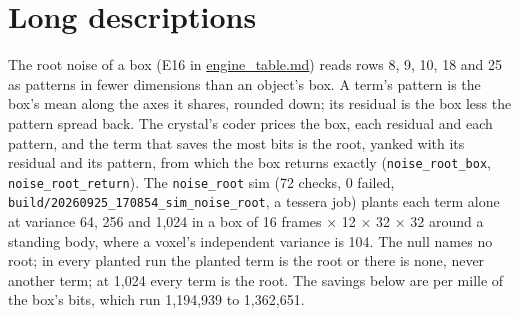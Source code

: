 \section{\texorpdfstring{Long descriptions}{Long descriptions}}

The root noise of a box (E16 in \hyperref[chap:engine-table]{engine\_\allowbreak{}table.md}) reads rows 8, 9, 10, 18 and 25 as patterns in fewer dimensions than an object's box. A term's pattern is the box's mean along the axes it shares, rounded down; its residual is the box less the pattern spread back. The crystal's coder prices the box, each residual and each pattern, and the term that saves the most bits is the root, yanked with its residual and its pattern, from which the box returns exactly (\texttt{noise\_\allowbreak{}root\_\allowbreak{}box}, \texttt{noise\_\allowbreak{}root\_\allowbreak{}return}). The \texttt{noise\_\allowbreak{}root} sim (72 checks, 0 failed, \texttt{build/\allowbreak{}20260925\_\allowbreak{}170854\_\allowbreak{}sim\_\allowbreak{}noise\_\allowbreak{}root}, a tessera job) plants each term alone at variance 64, 256 and 1,024 in a box of 16 frames × 12 × 32 × 32 around a standing body, where a voxel's independent variance is 104. The null names no root; in every planted run the planted term is the root or there is none, never another term; at 1,024 every term is the root. The savings below are per mille of the box's bits, which run 1,194,939 to 1,362,651.

